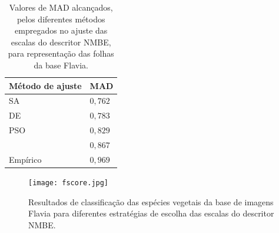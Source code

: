 \begin{table}[]
	\centering
	\caption{Valores de \ac{MAD} alcançados, pelos diferentes métodos empregados no ajuste das escalas do descritor \ac{NMBE}, para representação das folhas da base Flavia.}
	\label{tab:leaves_supervised_results}
	\begin{tabular}{ll}
		\toprule[1.5pt]
		Método de ajuste& \ac{MAD}\\
		\midrule
		\ac{SA}  & $0,762$\\
		\ac{DE}  & $0,783$\\
		\ac{PSO}&  $0,829$\\
		\citeonline{Cesar:1996}& $0,867$\\
		Empírico& $0,969$\\
		\bottomrule[1.5pt]
	\end{tabular}
\end{table}

\begin{figure}[!htb]
	\caption{\label{fig:leaves_fscore} Resultados de classificação das espécies vegetais da base de imagens Flavia para diferentes estratégias de escolha das escalas do descritor \ac{NMBE}.}
	\centering
	\texttt{[image: fscore.jpg]}
\end{figure}


